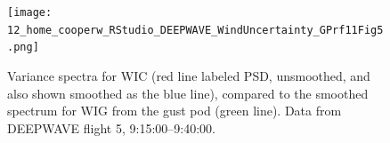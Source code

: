 \documentclass[12pt,twoside,english]{article}\usepackage[]{graphicx}\usepackage[]{color}
\let\OrgIndex\index
\renewcommand*{\index}[1]{\OrgIndex{#1}}
\begin{document}
% 
% 
% 

\begin{figure}
\noindent \begin{centering}
\texttt{[image: 12\_home\_cooperw\_RStudio\_DEEPWAVE\_WindUncertainty\_GPrf11Fig5.png]}  
\par\end{centering}

\protect\caption{\label{fig:VarSpecWICandWIG}Variance spectra for WIC (red line labeled PSD, unsmoothed, and also shown smoothed as the blue line), compared to the smoothed spectrum for WIG from the gust pod (green line). Data from DEEPWAVE flight 5, 9:15:00--9:40:00.} 
\end{figure}
\end{document}
